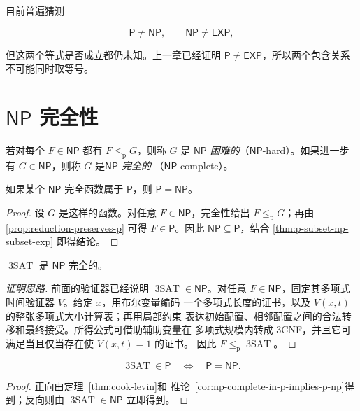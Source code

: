 目前普遍猜测

\[
  \mathsf P\neq\mathsf{NP},
  \qquad
  \mathsf{NP}\neq\mathsf{EXP},
\]

但这两个等式是否成立都仍未知。上一章已经证明
$\mathsf P\neq\mathsf{EXP}$，所以两个包含关系不可能同时取等号。

\section{\texorpdfstring{$\mathsf{NP}$}{NP} 完全性}

\begin{definition}
  \label{def:np-hard-complete}
  若对每个 $F\in\mathsf{NP}$ 都有 $F\leq_{\mathrm p}G$，则称 $G$ 是
  \emph{$\mathsf{NP}$ 困难的}（$\mathsf{NP}$-hard）。如果进一步有
  $G\in\mathsf{NP}$，则称 $G$ 是\emph{$\mathsf{NP}$ 完全的}
  （$\mathsf{NP}$-complete）。
\end{definition}

\begin{corollary}
  \label{cor:np-complete-in-p-implies-p-np}
  如果某个 $\mathsf{NP}$ 完全函数属于 $\mathsf P$，则
  $\mathsf P=\mathsf{NP}$。
\end{corollary}

\begin{proof}
  设 $G$ 是这样的函数。对任意 $F\in\mathsf{NP}$，完全性给出
  $F\leq_{\mathrm p}G$；再由 \cref{prop:reduction-preserves-p} 可得
  $F\in\mathsf P$。因此 $\mathsf{NP}\subseteq\mathsf P$，结合
  \cref{thm:p-subset-np-subset-exp} 即得结论。
\end{proof}

\begin{theorem}
  \label{thm:cook-levin}
  $\operatorname{3SAT}$ 是 $\mathsf{NP}$ 完全的。
\end{theorem}

\begin{proof}[证明思路]
  前面的验证器已经说明 $\operatorname{3SAT}\in\mathsf{NP}$。对任意
  $F\in\mathsf{NP}$，固定其多项式时间验证器 $V$。给定 $x$，用布尔变量编码
  一个多项式长度的证书，以及 $V(x,t)$ 的整张多项式大小计算表；再用局部约束
  表达初始配置、相邻配置之间的合法转移和最终接受。所得公式可借助辅助变量在
  多项式规模内转成 3CNF，并且它可满足当且仅当存在使 $V(x,t)=1$ 的证书。
  因此 $F\leq_{\mathrm p}\operatorname{3SAT}$。
\end{proof}

\begin{corollary}
  \label{cor:3sat-in-p-iff-p-np}
  \[
    \operatorname{3SAT}\in\mathsf P
    \quad\Longleftrightarrow\quad
    \mathsf P=\mathsf{NP}.
  \]
\end{corollary}

\begin{proof}
  正向由定理~\ref{thm:cook-levin}和
  推论~\ref{cor:np-complete-in-p-implies-p-np}得到；反向则由
  $\operatorname{3SAT}\in\mathsf{NP}$ 立即得到。
\end{proof}
